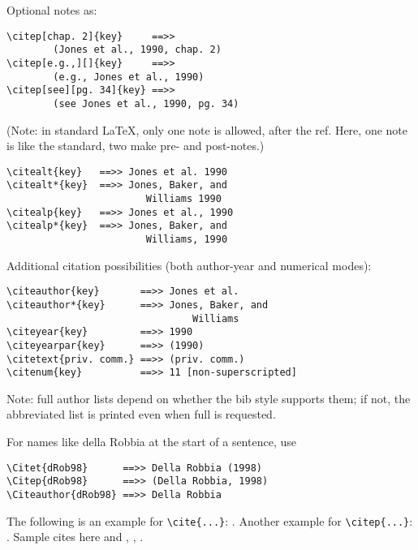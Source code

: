 \documentclass[unnumsec,webpdf,contemporary,large]{oup-authoring-template}%
\theoremstyle{thmstyleone}%
\theoremstyle{thmstyletwo}%
\theoremstyle{thmstylethree}%
\begin{document}
\noindent
Optional notes as:


{%
\begin{verbatim}
\citep[chap. 2]{key}     ==>>
        (Jones et al., 1990, chap. 2)
\citep[e.g.,][]{key}     ==>>
        (e.g., Jones et al., 1990)
\citep[see][pg. 34]{key} ==>>
        (see Jones et al., 1990, pg. 34)
\end{verbatim}}


\noindent
(Note: in standard LaTeX, only one note is allowed, after the ref.
Here, one note is like the standard, two make pre- and post-notes.)


{%
	\begin{verbatim}
\citealt{key}   ==>> Jones et al. 1990
\citealt*{key}  ==>> Jones, Baker, and
                        Williams 1990
\citealp{key}   ==>> Jones et al., 1990
\citealp*{key}  ==>> Jones, Baker, and
                        Williams, 1990
\end{verbatim}}


\noindent
Additional citation possibilities (both author-year and numerical modes):


{%
\begin{verbatim}
\citeauthor{key}       ==>> Jones et al.
\citeauthor*{key}      ==>> Jones, Baker, and
                                Williams
\citeyear{key}         ==>> 1990
\citeyearpar{key}      ==>> (1990)
\citetext{priv. comm.} ==>> (priv. comm.)
\citenum{key}          ==>> 11 [non-superscripted]
\end{verbatim}}


\noindent
Note: full author lists depend on whether the bib style supports them;
if not, the abbreviated list is printed even when full is requested.

\noindent
For names like della Robbia at the start of a sentence, use


	{%
		\begin{verbatim}
\Citet{dRob98}      ==>> Della Robbia (1998)
\Citep{dRob98}      ==>> (Della Robbia, 1998)
\Citeauthor{dRob98} ==>> Della Robbia
\end{verbatim}}


\noindent
The following is an example for \verb+\cite{...}+: \cite{rahman2019centroidb}. Another example for \verb+\citep{...}+: \citep{bahdanau2014neural,imboden2018cardiorespiratory,motiian2017unified,murphy2012machine,ji20123d}.
Sample cites here \cite{krizhevsky2012imagenet,horvath2018dna} and \cite{pyrkov2018quantitative}, \cite{wang2018face}, \cite{lecun2015deep,zhang2018fine,ravi2016deep}.
\end{document}
